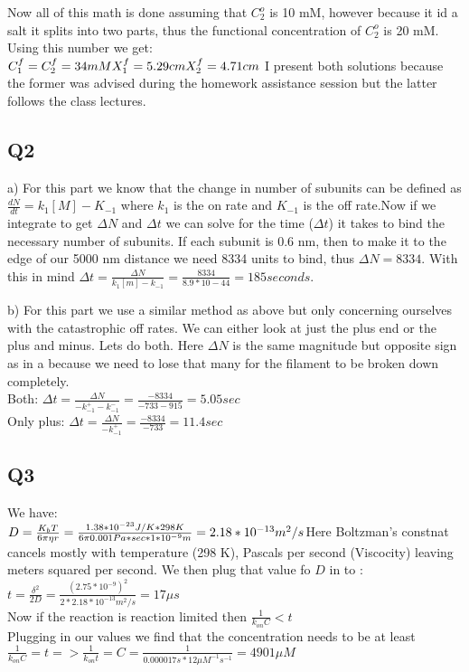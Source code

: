 \documentclass[12pt]{article}
\begin{document}
Now all of this math is done assuming that $C_2^o$ is 10 mM, however because it id a salt it splits into two parts, thus the functional concentration of $C_2^o$ is 20 mM. Using this number we get:\\
$
C_1^f =C_2^f = 34 mM\\
X_1^f = 5.29 cm\\
X_2^f = 4.71 cm\\
$
I present both solutions because the former was advised during the homework assistance session but the latter follows the class lectures.

\subsection{Q2}
a) For this part we know that the change in number of subunits can be defined as $\frac{dN}{dt} = k_1[M] - K_{-1}$ where $k_1$ is the on rate and $K_{-1}$ is the off rate.Now if we integrate to get $\Delta N$ and $\Delta t$ we can solve for the time ($\Delta t$) it takes to bind the necessary number of subunits. If each subunit is 0.6 nm, then to make it to the edge of our 5000 nm distance we need 8334 units to bind, thus $\Delta N = 8334$. With this in mind $\Delta t = \frac{\Delta N}{k_1[m] - k_{-1}} = \frac{8334}{8.9*10 - 44} = 185 seconds$.

b) For this part we use a similar method as above but only concerning ourselves with the catastrophic off rates. We can either look at just the plus end or the plus and minus. Lets do both. Here $\Delta N$ is the same magnitude but opposite sign as in a because we need to lose that many for the filament to be broken down completely. \\
Both: $\Delta t = \frac{\Delta N}{-k_{-1}^+ - k_{-1}^-} = \frac{-8334}{-733 -915} = 5.05 sec$\\
Only plus: $\Delta t = \frac{\Delta N}{-k_{-1}^+} = \frac{-8334}{-733 } =  11.4 sec$\\

\subsection{Q3}
We have:\\
$D = \frac{K_bT}{6\pi \eta r} = \frac{1.38*10^{-23} J/K * 298K}{6\pi 0.001 Pa*sec * 1*10^{-9}m} = 2.18*10^{-13} m^2/s\\
$Here  Boltzman's constnat cancels mostly with temperature (298 K), Pascals per second (Viscocity) leaving meters squared per second.
We then plug that value fo $D$ in to :\\
$t = \frac{\delta^2}{2D} = \frac{(2.75*10^{-9})^2}{2*2.18*10^{-13} m^2/s} = 17 \mu s$\\
Now if the reaction is reaction limited then $\frac{1}{k_{on}C}<t$\\
Plugging in our values we find that the concentration needs to be at least $\frac{1}{k_{on}C} = t => \frac{1}{k_{on}t}=C = \frac{1}{0.000017 s * 12 \mu M^{-1}s^{-1}} = 4901 \mu M$\\
\end{document}
